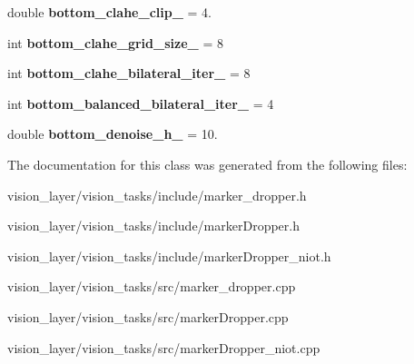 \begin{DoxyCompactItemize}
\mbox{\label{classMarkerDropper_ab1f4f4ed6a0691eaaf24e1f0bb8c20ed}} 
double {\bfseries bottom\+\_\+clahe\+\_\+clip\+\_\+} = 4.
\item 
\mbox{\label{classMarkerDropper_a97f2c6dd6b1cffa4ac7ee3a03c42edd0}} 
int {\bfseries bottom\+\_\+clahe\+\_\+grid\+\_\+size\+\_\+} = 8
\item 
\mbox{\label{classMarkerDropper_a1b87c6207ae2f9b5be1252c80f6a2f29}} 
int {\bfseries bottom\+\_\+clahe\+\_\+bilateral\+\_\+iter\+\_\+} = 8
\item 
\mbox{\label{classMarkerDropper_a8ec68edd01310878f1313c6d5c26ae12}} 
int {\bfseries bottom\+\_\+balanced\+\_\+bilateral\+\_\+iter\+\_\+} = 4
\item 
\mbox{\label{classMarkerDropper_ab73c9b6e3cc690545ab81a47595ccc89}} 
double {\bfseries bottom\+\_\+denoise\+\_\+h\+\_\+} = 10.
\end{DoxyCompactItemize}


The documentation for this class was generated from the following files\+:\begin{DoxyCompactItemize}
\item 
vision\+\_\+layer/vision\+\_\+tasks/include/marker\+\_\+dropper.\+h\item 
vision\+\_\+layer/vision\+\_\+tasks/include/marker\+Dropper.\+h\item 
vision\+\_\+layer/vision\+\_\+tasks/include/marker\+Dropper\+\_\+niot.\+h\item 
vision\+\_\+layer/vision\+\_\+tasks/src/marker\+\_\+dropper.\+cpp\item 
vision\+\_\+layer/vision\+\_\+tasks/src/marker\+Dropper.\+cpp\item 
vision\+\_\+layer/vision\+\_\+tasks/src/marker\+Dropper\+\_\+niot.\+cpp\end{DoxyCompactItemize}
